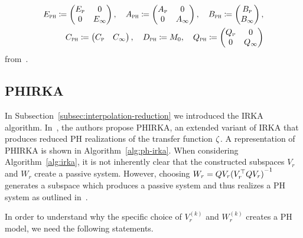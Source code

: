 \begin{equation}\label{eq:prbt-ph-system}
    \begin{aligned}
        E_{\textnormal{\scshape ph}} \coloneqq \begin{pmatrix}
            E_{\textnormal{\scshape p}} & 0 \\
            0 & E_\infty
        \end{pmatrix},\quad A_{\textnormal{\scshape ph}} \coloneqq \begin{pmatrix}
            A_{\textnormal{\scshape p}} & 0 \\
            0 & A_\infty
        \end{pmatrix},\quad B_{\textnormal{\scshape ph}} \coloneqq \begin{pmatrix}
            B_{\textnormal{\scshape p}} \\
            B_\infty
        \end{pmatrix}, \\
        C_{\textnormal{\scshape ph}} \coloneqq \begin{pmatrix}
            C_{\textnormal{\scshape p}} & C_\infty
        \end{pmatrix},\quad D_{\textnormal{\scshape ph}} \coloneqq M_0,\quad Q_{\textnormal{\scshape ph}} \coloneqq \begin{pmatrix}
            Q_{\textnormal{\scshape p}} & 0 \\
            0 & Q_\infty
        \end{pmatrix}
    \end{aligned}
\end{equation}
from~\cite[Lemma~5.6]{CGH2022}.

\subsection{\acl{PHIRKA}}\label{subsec:ph-irka}

In Subsection~\ref{subsec:interpolation-reduction} we introduced the \ac{IRKA} algorithm.
In~\cite{Gugercin2012}, the authors propose \acf{PHIRKA}, an extended variant of \ac{IRKA} that produces reduced \ac{PH} realizations of the transfer function $\zeta$.
A representation of \ac{PHIRKA} is shown in Algorithm~\ref{alg:ph-irka}.
When considering Algorithm~\ref{alg:irka}, it is not inherently clear that the constructed subspaces $V_r$ and $W_r$ create a passive system.
However, choosing $W_r = Q V_r {(V_r\trans Q V_r)}\inv$ generates a subspace which produces a passive system and thus realizes a \ac{PH} system as outlined in~\cite[Section~2.4]{Breiten2022}.

In order to understand why the specific choice of $V_r^{(k)}$ and $W_r^{(k)}$ creates a \ac{PH} model, we need the following statements.


